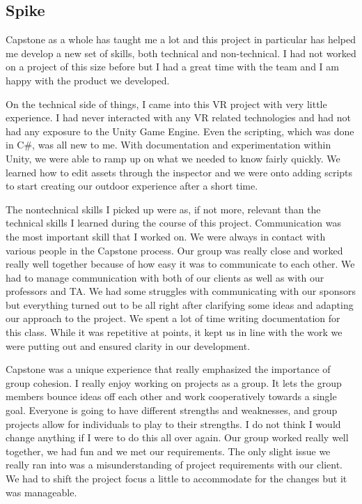 \documentclass[10pt,journal,compsoc,onecolumn, draftclsnofoot]{IEEEtran}
\begin{document}
\subsection{Spike}

Capstone as a whole has taught me a lot and this project in particular has helped me develop a new set of skills, both technical and non-technical. I had not worked on a project of this size before but I had a great time with the team and I am happy with the product we developed.

On the technical side of things, I came into this VR project with very little experience. I had never interacted with any VR related technologies and had not had any exposure to the Unity Game Engine. Even the scripting, which was done in C\#, was all new to me. With documentation and experimentation within Unity, we were able to ramp up on what we needed to know fairly quickly. We learned how to edit assets through the inspector and we were onto adding scripts to start creating our outdoor experience after a short time.

The nontechnical skills I picked up were as, if not more, relevant than the technical skills I learned during the course of this project. Communication was the most important skill that I worked on. We were always in contact with various people in the Capstone process. Our group was really close and worked really well together because of how easy it was to communicate to each other. We had to manage communication with both of our clients as well as with our professors and TA. We had some struggles with communicating with our sponsors but everything turned out to be all right after clarifying some ideas and adapting our approach to the project. We spent a lot of time writing documentation for this class. While it was repetitive at points, it kept us in line with the work we were putting out and ensured clarity in our development.

Capstone was a unique experience that really emphasized the importance of group cohesion. I really enjoy working  on projects as a group. It lets the group members bounce ideas off each other and work cooperatively towards a single goal. Everyone is going to have different strengths and weaknesses, and group projects allow for individuals to play to their strengths. I do not think I would change anything if I were to do this all over again. Our group worked really well together, we had fun and we met our requirements. The only slight issue we really ran into was a misunderstanding of project requirements with our client. We had to shift the project focus a little to accommodate for the changes but it was manageable.
\end{document}
